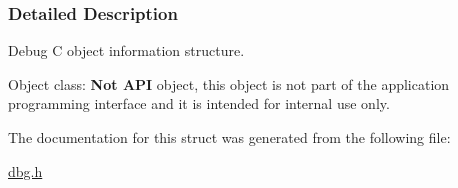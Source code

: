 \subsubsection{Detailed Description}
Debug C object information structure. 

\begin{DoxyParagraph}{Object class\-:}
{\bfseries Not A\-P\-I} object, this object is not part of the application programming interface and it is intended for internal use only. 
\end{DoxyParagraph}


The documentation for this struct was generated from the following file\-:\begin{DoxyCompactItemize}
\item 
\hyperlink{dbg_8h}{dbg.\-h}\end{DoxyCompactItemize}
